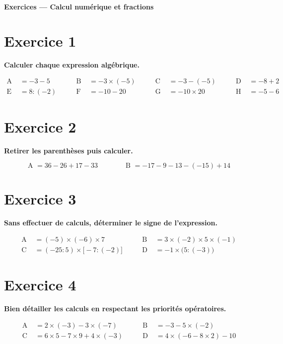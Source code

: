\documentclass[a4paper,11pt]{article}
\begin{document}
{\Large \textbf{Exercices — Calcul numérique et fractions}}\par\medskip

\section*{Exercice 1}
\textbf{Calculer chaque expression algébrique.}

\[
\begin{aligned}
\text{A }&= -3-5
&\qquad \text{B }&= -3\times(-5)
&\qquad \text{C }&= -3-(-5)
&\qquad \text{D }&= -8+2\\[2pt]
\text{E }&= 8:(-2)
&\qquad \text{F }&= -10-20
&\qquad \text{G }&= -10\times 20
&\qquad \text{H }&= -5-6
\end{aligned}
\]

\section*{Exercice 2}
\textbf{Retirer les parenthèses puis calculer.}

\[
\text{A }= 36-26+17-33
\qquad\qquad
\text{B }= -17-9-13-(-15)+14
\]

\section*{Exercice 3}
\textbf{Sans effectuer de calculs, déterminer le signe de l'expression.}

\[
\begin{aligned}
\text{A }&= (-5)\times(-6)\times 7
&\qquad
\text{B }&= 3\times(-2)\times 5\times(-1)\\[2pt]
\text{C }&= (-25:5)\times\bigl[-7:(-2)\bigr]
&\qquad
\text{D }&= -1\times\bigl(5:(-3)\bigr)
\end{aligned}
\]

\section*{Exercice 4}
\textbf{Bien détailler les calculs en respectant les priorités opératoires.}

\[
\begin{aligned}
\text{A }&= 2\times(-3)-3\times(-7)
&\qquad
\text{B }&= -3-5\times(-2)\\[2pt]
\text{C }&= 6\times 5 - 7\times 9 + 4\times(-3)
&\qquad
\text{D }&= 4\times(-6-8\times 2)-10
\end{aligned}
\]
\end{document}
